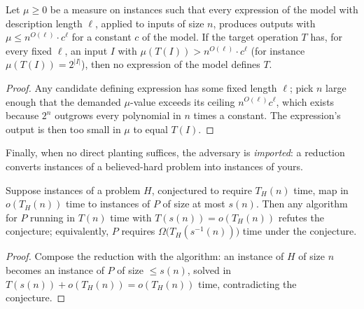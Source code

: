 \begin{proposition}\label{prop:adv-ceiling}
Let $\mu \ge 0$ be a measure on instances such that every expression of the model with
description length $\ell$, applied to inputs of size $n$, produces outputs with
$\mu \le n^{O(\ell)} \cdot c^{\ell}$ for a constant $c$ of the model. If the target operation
$T$ has, for every fixed $\ell$, an input $I$ with $\mu(T(I)) > n^{O(\ell)} \cdot c^{\ell}$
(for instance $\mu(T(I)) = 2^{|I|}$), then no expression of the model defines $T$. \eop
\end{proposition}

\begin{proof}
Any candidate defining expression has some fixed length $\ell$; pick $n$ large enough that the
demanded $\mu$-value exceeds its ceiling $n^{O(\ell)} c^{\ell}$, which exists because $2^n$
outgrows every polynomial in $n$ times a constant. The expression's output is then too small
in $\mu$ to equal $T(I)$.
\end{proof}


Finally, when no direct planting suffices, the adversary is \emph{imported}: a reduction
converts instances of a believed-hard problem into instances of yours.

\begin{proposition}\label{prop:adv-reduction}
Suppose instances of a problem $H$, conjectured to require $T_H(n)$ time, map in
$o(T_H(n))$ time to instances of $P$ of size at most $s(n)$. Then any algorithm for $P$
running in $T(n)$ time with $T(s(n)) = o(T_H(n))$ refutes the conjecture; equivalently, $P$
requires $\Omega\bigl(T_H(s^{-1}(n))\bigr)$ time under the conjecture. \eop
\end{proposition}

\begin{proof}
Compose the reduction with the algorithm: an instance of $H$ of size $n$ becomes an instance of
$P$ of size $\le s(n)$, solved in $T(s(n)) + o(T_H(n)) = o(T_H(n))$ time, contradicting the
conjecture.
\end{proof}

